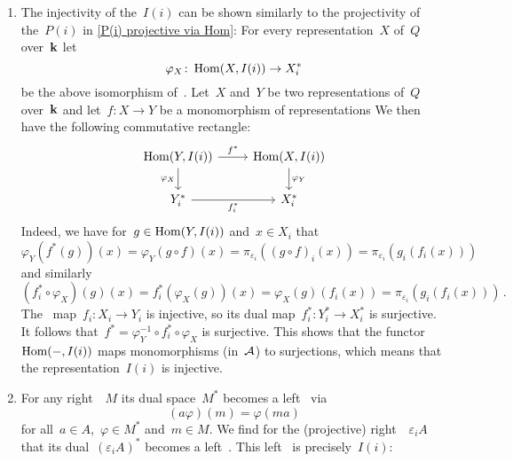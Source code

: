 \begin{remark*}
  \leavevmode
  \begin{enumerate}
    \item
      The injectivity of the~$I(i)$ can be shown similarly to the projectivity of the~$P(i)$ in \cref{P(i) projective via Hom}:
      For every representation~$X$ of~$Q$ over~$\mathbf{k}$ let
      \[
        \varphi_X
        \colon
        \operatorname{Hom}(X, I(i))
        \to
        X_i^*
      \]
      be the above isomorphism of~{\kvss}.
      Let~$X$ and~$Y$ be two representations of~$Q$ over~$\mathbf{k}$ and let~$f \colon X \to Y$ be a monomorphism of representations
      We then have the following commutative rectangle:
      \[
        \begin{tikzcd}
            \Hom(Y, I(i))
            \arrow{r}[above]{f^*}
            \arrow{d}[left]{\varphi_X}
          & \Hom(X, I(i))
            \arrow{d}[right]{\varphi_Y}
          \\
            Y_i^*
            \arrow{r}[below]{f_i^*}
          & X_i^*
        \end{tikzcd}
      \]
      Indeed, we have for~$g \in \operatorname{Hom}(Y,I(i))$ and~$x \in X_i$ that
      \[
        \varphi_Y( f^*(g) )(x)
        =
        \varphi_Y( g \circ f )(x)
        =
        \pi_{\varepsilon_i}( (g \circ f)_i(x) )
        =
        \pi_{\varepsilon_i}( g_i( f_i(x) ) )
      \]
      and similarly
      \[
        (f_i^* \circ \varphi_X)(g)(x)
        =
        f_i^*( \varphi_X(g) )(x)
        =
        \varphi_X(g)( f_i(x) )
        =
        \pi_{\varepsilon_i}( g_i( f_i(x) ) )  \,.
      \]
      The~{\klin} map~$f_i \colon X_i \to Y_i$ is injective, so its dual map~$f_i^* \colon Y_i^* \to X_i^*$ is surjective.
      It follows that~$f^* = \varphi_Y^{-1} \circ f_i^* \circ \varphi_X$ is surjective.
      This shows that the functor~$\operatorname{Hom}(-,I(i))$ maps monomorphisms (in~$\mathcal{A}$) to surjections, which means that the representation~$I(i)$ is injective.
    \item
      For any right~{}~$M$ its dual space~$M^*$ becomes a left~{} via
      \[
        (a \varphi)(m)
        =
        \varphi(m a) 
      \]
      for all~$a \in A$,~$\varphi \in M^*$ and~$m \in M$.
      We find for the (projective) right~{}~$\varepsilon_i A$ that its dual~$(\varepsilon_i A)^*$ becomes a left~{}.
      This left~{} is precisely~$I(i)$:
      

\end{enumerate}
\end{remark*}
